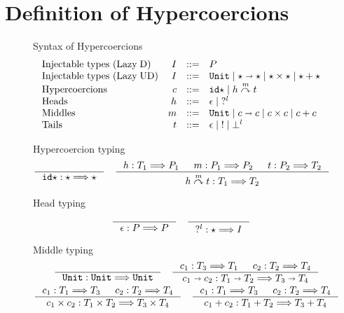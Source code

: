 \documentclass[acmsmall,review,anonymous]{acmart}\settopmatter{printfolios=true,printccs=false,printacmref=false}
\newcommand{\stxrule}[3]{\text{#2} & #1 & ::= & #3\\}
\newcommand{\plus}[0]{+}
\newcommand{\lazyUD}{Lazy\;UD}
\newcommand{\lazyD}{Lazy\;D}
\newcommand{\TOOdyn}[0]{\star}
\newcommand{\POOunit}[0]{\mathtt{Unit}}
\newcommand{\POOfun}[2]{#1 \shortrightarrow #2}
\newcommand{\POOprod}[2]{#1 \times #2}
\newcommand{\POOsum}[2]{#1 \plus #2}
\newcommand{\typingHC}[3]{#1 : #2 \Longrightarrow #3}
\newcommand{\hyperCoercionI}[0]{\mathtt{id\star}}
\newcommand{\hyperCoercionC}[3]{#1 \overset{#2}{\curvearrowright} #3}
\begin{document}


\section{Definition of Hypercoercions} \label{sec:hypercoercion-definition}

\begin{figure}
  Syntax of Hypercoercions
  \[
  \begin{array}{lrcl}
  \stxrule{I}{Injectable types (\lazyD)}{P}
  \stxrule{I}{Injectable types (\lazyUD)}{
    \POOunit \mid
    \POOfun{\TOOdyn}{\TOOdyn} \mid
    \POOprod{\TOOdyn}{\TOOdyn} \mid
    \POOsum{\TOOdyn}{\TOOdyn}
  }
  \stxrule{c}{Hypercoercions}{
    \hyperCoercionI \mid{}
    \hyperCoercionC{h}{m}{t}
  }
  \stxrule{h}{Heads}{
    \epsilon \mid{}
    ?^l
  }
  \stxrule{m}{Middles}{
    \POOunit \mid
    \POOfun{c}{c} \mid
    \POOprod{c}{c} \mid
    \POOsum{c}{c}
  }
  \stxrule{t}{Tails}{
    \epsilon \mid{}
    ! \mid{}
    \bot^l
  }
  \end{array}
  \]
    
  Hypercoercion typing 
  \begin{gather*}
  \inference{}{\typingHC{\hyperCoercionI}{\TOOdyn}{\TOOdyn}}
  \quad
  \inference{
    \typingHC{h}{T_1}{P_1} &
    \typingHC{m}{P_1}{P_2} &
    \typingHC{t}{P_2}{T_2}
  }{
    \typingHC{\hyperCoercionC{h}{m}{t}}{T_1}{T_2}
  }
  \end{gather*}
  
  Head typing \fbox{$\typingHC{h}{T}{P}$}
  \begin{gather*}
  \inference{}{\typingHC{\epsilon}{P}{P}}
  \quad
  \inference{}{\typingHC{?^l}{\TOOdyn}{I}}
  \end{gather*}
  
  Middle typing \fbox{$\typingHC{m}{T}{T}$}
  \begin{gather*}
  \inference{}{\typingHC{\POOunit}{\POOunit}{\POOunit}}
  \quad
  \inference{
    \typingHC{c_1}{T_3}{T_1} &
    \typingHC{c_2}{T_2}{T_4}
  }{
    \typingHC{\POOfun{c_1}{c_2}}{\POOfun{T_1}{T_2}}{\POOfun{T_3}{T_4}}
  }
  \\
  \inference{
    \typingHC{c_1}{T_1}{T_3} &
    \typingHC{c_2}{T_2}{T_4}
  }{
    \typingHC{\POOprod{c_1}{c_2}}{\POOprod{T_1}{T_2}}{\POOprod{T_3}{T_4}}
  }
  \quad
  \inference{
    \typingHC{c_1}{T_1}{T_3} &
    \typingHC{c_2}{T_2}{T_4}
  }{
    \typingHC{\POOsum{c_1}{c_2}}{\POOsum{T_1}{T_2}}{\POOsum{T_3}{T_4}}
  }
    \end{gather*}
    

\end{figure}
\end{document}
